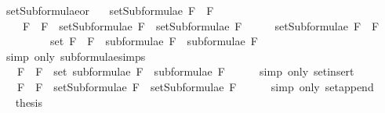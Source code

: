 \begin{isabellebody}
\ setSubformulae{\isacharunderscore}or{\isacharcolon}\ \isanewline
\ \ {\isachardoublequoteopen}setSubformulae\ {\isacharparenleft}F{}\ \isactrlbold {\isasymor}\ F{}{\isacharparenright}\ \isanewline
\ \ \ {\isacharequal}\ {\isacharbraceleft}F{}\ \isactrlbold {\isasymor}\ F{}{\isacharbraceright}\ {\isasymunion}\ {\isacharparenleft}setSubformulae\ F{}\ {\isasymunion}\ setSubformulae\ F{}{\isacharparenright}{\isachardoublequoteclose}\isanewline
%
\isadelimproof
%
\endisadelimproof
%
\isatagproof
{}\isamarkupfalse%
\ {\isacharminus}\isanewline
\ \ \isamarkupfalse%
\ {\isachardoublequoteopen}setSubformulae\ {\isacharparenleft}F{}\ \isactrlbold {\isasymor}\ F{}{\isacharparenright}\ \isanewline
\ \ \ \ \ \ \ \ {\isacharequal}\ set\ {\isacharparenleft}{\isacharparenleft}F{}\ \isactrlbold {\isasymor}\ F{}{\isacharparenright}\ {\isacharhash}\ {\isacharparenleft}subformulae\ F{}\ {\isacharat}\ subformulae\ F{}{\isacharparenright}{\isacharparenright}{\isachardoublequoteclose}\isanewline
\ \ \ \ \isamarkupfalse%
\ {\isacharparenleft}simp\ only{\isacharcolon}\ subformulae{\isachardot}simps{\isacharparenleft}{}{\isacharparenright}{\isacharparenright}\isanewline
\ \ \isamarkupfalse%
\ \isamarkupfalse%
\ {\isachardoublequoteopen}{\isasymdots}\ {\isacharequal}\ {\isacharbraceleft}F{}\ \isactrlbold {\isasymor}\ F{}{\isacharbraceright}\ {\isasymunion}\ {\isacharparenleft}set\ {\isacharparenleft}subformulae\ F{}\ {\isacharat}\ subformulae\ F{}{\isacharparenright}{\isacharparenright}{\isachardoublequoteclose}\isanewline
\ \ \ \ \isamarkupfalse%
\ {\isacharparenleft}simp\ only{\isacharcolon}\ set{\isacharunderscore}insert{\isacharparenright}\isanewline
\ \ \isamarkupfalse%
\ \isamarkupfalse%
\ {\isachardoublequoteopen}{\isasymdots}\ {\isacharequal}\ {\isacharbraceleft}F{}\ \isactrlbold {\isasymor}\ F{}{\isacharbraceright}\ {\isasymunion}\ {\isacharparenleft}setSubformulae\ F{}\ {\isasymunion}\ setSubformulae\ F{}{\isacharparenright}{\isachardoublequoteclose}\isanewline
\ \ \ \ \isamarkupfalse%
\ {\isacharparenleft}simp\ only{\isacharcolon}\ set{\isacharunderscore}append{\isacharparenright}\isanewline
\ \ \isamarkupfalse%
\ \isamarkupfalse%
\ {\isacharquery}thesis\isanewline

\end{isabellebody}
